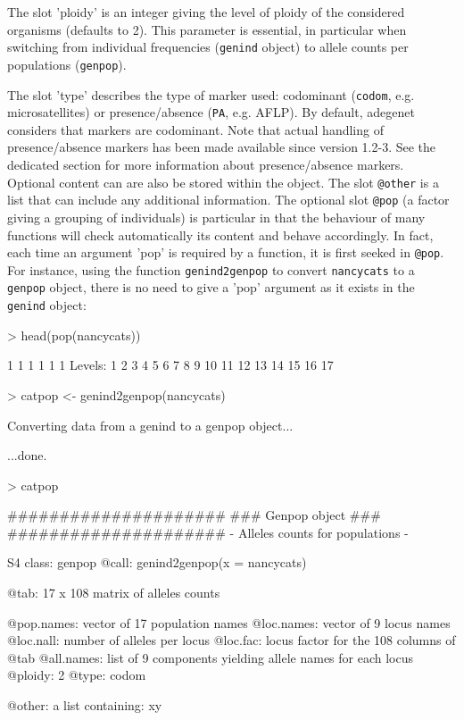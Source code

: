 \documentclass{article}
\begin{document}
The slot 'ploidy' is an integer giving the level of ploidy
of the considered organisms (defaults to 2).
This parameter is essential, in particular when switching from
individual frequencies (\texttt{genind} object) to allele counts per
populations (\texttt{genpop}).

\noindent
The slot 'type' describes the type of marker used: codominant (\texttt{codom}, e.g. microsatellites) or presence/absence (\texttt{PA}, e.g. AFLP).
By default, adegenet considers that markers are codominant.
Note that actual handling of presence/absence markers has been made available since version 1.2-3.
See the dedicated section for more information about presence/absence markers.
\\


Optional content can are also be stored within the object.
The slot \texttt{@other} is a list that can include any additional information.
The optional slot \texttt{@pop} (a factor giving a grouping of individuals) is particular in that
the behaviour of many functions will check automatically its content and behave accordingly.
In fact, each time an argument 'pop' is required by a function, it is first seeked in \texttt{@pop}.
For instance, using the function \texttt{genind2genpop} to convert \texttt{nancycats} to a \texttt{genpop} object, there is no need to give a 'pop' argument as it exists in the \texttt{genind} object:
\begin{Schunk}
\begin{Sinput}
> head(pop(nancycats))
\end{Sinput}
\begin{Soutput}
[1] 1 1 1 1 1 1
Levels: 1 2 3 4 5 6 7 8 9 10 11 12 13 14 15 16 17
\end{Soutput}
\begin{Sinput}
> catpop <- genind2genpop(nancycats)
\end{Sinput}
\begin{Soutput}
 Converting data from a genind to a genpop object... 

...done.
\end{Soutput}
\begin{Sinput}
> catpop
\end{Sinput}
\begin{Soutput}
       #####################
       ### Genpop object ### 
       #####################
- Alleles counts for populations - 

S4 class:  genpop
@call: genind2genpop(x = nancycats)

@tab:  17 x 108 matrix of alleles counts

@pop.names: vector of  17 population names
@loc.names: vector of  9 locus names
@loc.nall: number of alleles per locus
@loc.fac: locus factor for the  108 columns of @tab
@all.names: list of  9 components yielding allele names for each locus
@ploidy:  2
@type:  codom

@other: a list containing: xy 
\end{Soutput}
\end{Schunk}
\end{document}
